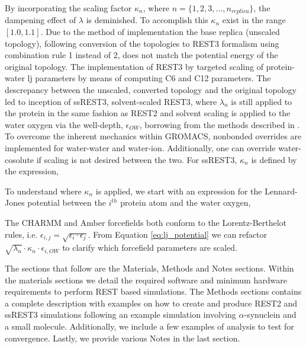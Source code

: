 By incorporating the scaling factor $\kappa_n$, where $n=\{1,2,3,\ldots,n_{replica}\}$, the dampening effect of $\lambda$ is deminished. 
To accomplish this $\kappa_n$ exist in the range $[1.0,1.1]$. 
Due to the method of implementation the base replica (unscaled topology), following conversion of the topologies to REST3 \cite{Zhang2023} formalism using combination rule 1 instead of 2, does not match the potential energy of the original topology. 
The implementation of REST3 by \citeauthor{Zhang2023} targeted scaling of protein-water lj parameters by means of computing C6 and C12 parameters. 
The descrepancy between the unscaled, converted topology and the original topology led to inception of ssREST3, solvent-scaled REST3,  where $\lambda_n$ is still applied to the protein in the same fashion as REST2 \cite{Wang2011} and solvent scaling is applied to the water oxygen via the well-depth, $\epsilon_{OW}$, borrowing from the methods described in \citeauthor{Best2010} \citeyear{Best2010}. 
To overcome the inherent mechanics within GROMACS\cite{VanDerSpoel2005}, nonbonded overrides are implemented for water-water and water-ion.
Additionally, one can override water-cosolute if scaling is not desired between the two. 
For ssREST3, $\kappa_n$ is defined by the expression, 


To understand where $\kappa_n$ is applied, we start with an expression for the Lennard-Jones potential between the $i^{th}$ protein atom and the water oxygen,


The CHARMM and Amber forcefields both conform to the Lorentz-Berthelot rules, i.e. $\epsilon_{i,j}=\sqrt{\epsilon_i\cdot \epsilon_j}$. From Equation \ref{eq:lj_potential} we can refactor $\sqrt{\lambda_n}\cdot\kappa_n\cdot\epsilon_{i,OW}$ to clarify which forcefield parameters are scaled. 


The sections that follow are the Materials, Methods and Notes sections.
Within the materials sections we detail the required software and minimum hardware requirements to perform REST based simulations.
The Methods sections contains a complete description with examples on how to create and produce REST2 and ssREST3 simulations following an example simulation involving $\alpha$-synuclein and a small molecule. Additionally, we include a few examples of analysis to test for convergence. Lastly, we provide various Notes in the last section. 